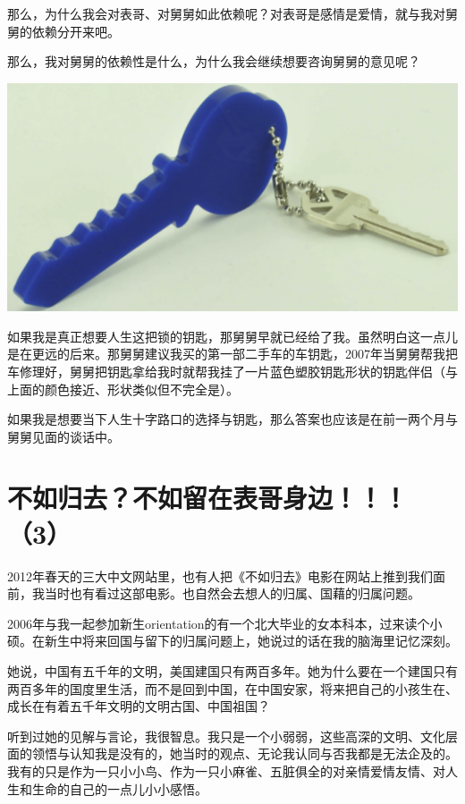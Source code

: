 \documentclass[9pt, b5paper]{article}
\begin{document}
那么，为什么我会对表哥、对舅舅如此依赖呢？对表哥是感情是爱情，就与我对舅舅的依赖分开来吧。

那么，我对舅舅的依赖性是什么，为什么我会继续想要咨询舅舅的意见呢？

\begin{center}
\includegraphics[width=.9\linewidth]{./pic/backups_plans_20210415_113132.png}
\end{center}

如果我是真正想要人生这把锁的钥匙，那舅舅早就已经给了我。虽然明白这一点儿是在更远的后来。那舅舅建议我买的第一部二手车的车钥匙，2007年当舅舅帮我把车修理好，舅舅把钥匙拿给我时就帮我挂了一片蓝色塑胶钥匙形状的钥匙伴侣（与上面的颜色接近、形状类似但不完全是）。

如果我是想要当下人生十字路口的选择与钥匙，那么答案也应该是在前一两个月与舅舅见面的谈话中。 

\section{不如归去？不如留在表哥身边！！！（3）}
\label{sec:org5ceea8e}

2012年春天的三大中文网站里，也有人把《不如归去》电影在网站上推到我们面前，我当时也有看过这部电影。也自然会去想人的归属、国藉的归属问题。 

2006年与我一起参加新生orientation的有一个北大毕业的女本科本，过来读个小硕。在新生中将来回国与留下的归属问题上，她说过的话在我的脑海里记忆深刻。

她说，中国有五千年的文明，美国建国只有两百多年。她为什么要在一个建国只有两百多年的国度里生活，而不是回到中国，在中国安家，将来把自己的小孩生在、成长在有着五千年文明的文明古国、中国祖国？

听到过她的见解与言论，我很智息。我只是一个小弱弱，这些高深的文明、文化层面的领悟与认知我是没有的，她当时的观点、无论我认同与否我都是无法企及的。我有的只是作为一只小小鸟、作为一只小麻雀、五脏俱全的对亲情爱情友情、对人生和生命的自己的一点儿小小感悟。
\end{document}
